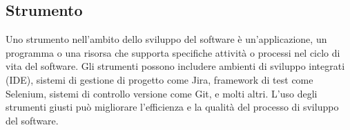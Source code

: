 \subsection{Strumento} 
Uno strumento nell'ambito dello sviluppo del software è un'applicazione, un programma o una risorsa che supporta specifiche attività o processi nel ciclo di vita del software. Gli strumenti possono includere ambienti di sviluppo integrati (IDE), sistemi di gestione di progetto come Jira, framework di test come Selenium, sistemi di controllo versione come Git, e molti altri. L'uso degli strumenti giusti può migliorare l'efficienza e la qualità del processo di sviluppo del software. 
